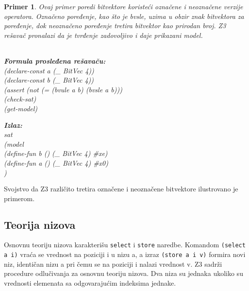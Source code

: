 \documentclass[12pt,oneside]{memoir}
\newcommand\tab[1][0.5cm]{\hspace*{#1}}
\newtheorem{primer}{Primer}
\begin{document}
\begin{primer} Ovaj primer poredi bitvektore koristeći označene i neoznačene verzije operatora. Označeno poređenje, kao što je bvsle, uzima u obzir znak bitvektora za poređenje, dok neoznačeno poređenje tretira bitvektor kao prirodan broj. Z3 rešavač pronalazi da je tvrđenje zadovoljivo i daje prikazani model.
\\ \\
\begin{minipage}[b]{0.5\textwidth}
\textbf{Formula prosleđena rešavaču:}
\\(declare-const a (\_ BitVec 4))
\\(declare-const b (\_ BitVec 4))
\\(assert (not (= (bvule a b) (bvsle a b)))
\\(check-sat)
\\(get-model)
\end{minipage}
\hspace{1.15cm} 
\begin{minipage}[t]{0.5\textwidth}
\vspace{-3.45cm}
\textbf{Izlaz:}
\\sat 
\\(model 
\\\tab(define-fun b () (\_ BitVec 4) \#xe) 
\\\tab(define-fun a () (\_ BitVec 4) \#x0)
\\)
\end{minipage}


\end{primer}
Svojstvo da Z3 različito tretira označene i neoznačene bitvektore ilustrovano je  primerom.
 

    



\subsection{Teorija nizova} 
Osnovnu teoriju nizova karakterišu \texttt{select} i \texttt{store} naredbe. 
Komandom \texttt{(select a i)} vraća se vrednost na poziciji i u nizu a, a izraz \texttt{(store a i v)} formira novi niz, identičan nizu a pri čemu se na poziciji i nalazi vrednost v.
Z3 sadrži procedure odlučivanja za osnovnu teoriju nizova.
Dva niza su jednaka ukoliko su vrednosti elemenata sa odgovarajućim indeksima jednake.
 
\end{document}
